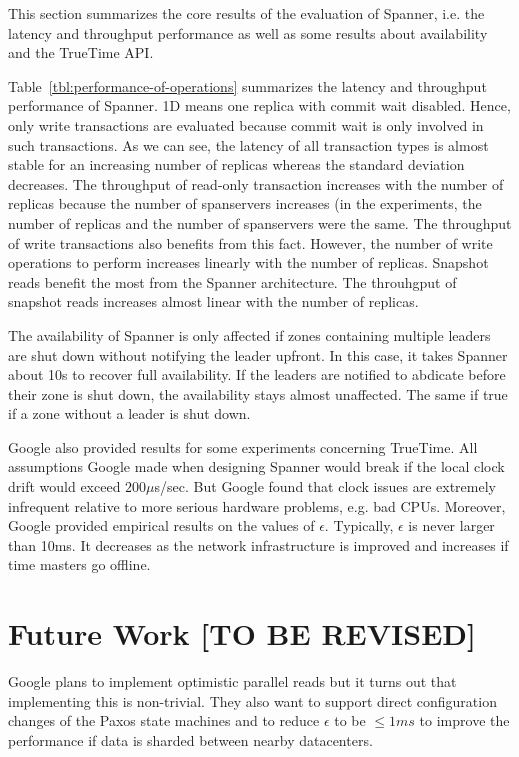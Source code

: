 \documentclass[onecolumn, a4paper, 10pt]{article}
\newcommand{\tbr}{{\color{red}\textbf{[TO BE REVISED]}}}
\begin{document}
This section summarizes the core results of the evaluation of Spanner, i.e. the
latency and throughput performance as well as some results about availability
and the TrueTime API.

Table~\ref{tbl:performance-of-operations} summarizes the latency and throughput
performance of Spanner. 1D means one replica with commit wait disabled. Hence,
only write transactions are evaluated because commit wait is only involved in such
transactions. As we can see, the latency of all transaction types is almost stable
for an increasing number of replicas whereas the standard deviation decreases.
The throughput of read-only transaction increases with the number of replicas
because the number of spanservers increases (in the experiments, the number of
replicas and the number of spanservers were the same. The throughput of write
transactions also benefits from this fact. However, the number of write operations
to perform increases linearly with the number of replicas. Snapshot reads benefit
the most from the Spanner architecture. The throuhgput of snapshot reads increases
almost linear with the number of replicas. 

The availability of Spanner is only affected if zones containing multiple leaders
are shut down without notifying the leader upfront. In this case, it takes Spanner
about 10s to recover full availability. If the leaders are notified to abdicate
before their zone is shut down, the availability stays almost unaffected. The same
if true if a zone without a leader is shut down.

Google also provided results for some experiments concerning TrueTime. All
assumptions Google made when designing Spanner would break if the local clock
drift would exceed $200\mu$s/sec. But Google found that clock issues are extremely
infrequent relative to more serious hardware problems, e.g. bad CPUs. Moreover,
Google provided empirical results on the values of $\epsilon$. Typically,
$\epsilon$ is never larger than 10ms. It decreases as the network infrastructure
is improved and increases if time masters go offline.

\section{Future Work \tbr}
\label{sec:future-work}

Google plans to implement optimistic parallel reads but it turns out that
implementing this is non-trivial. They also want to support direct configuration
changes of the Paxos state machines and to reduce $\epsilon$ to be $\leq 1ms$ to
improve the performance if data is sharded between nearby datacenters.
\end{document}
